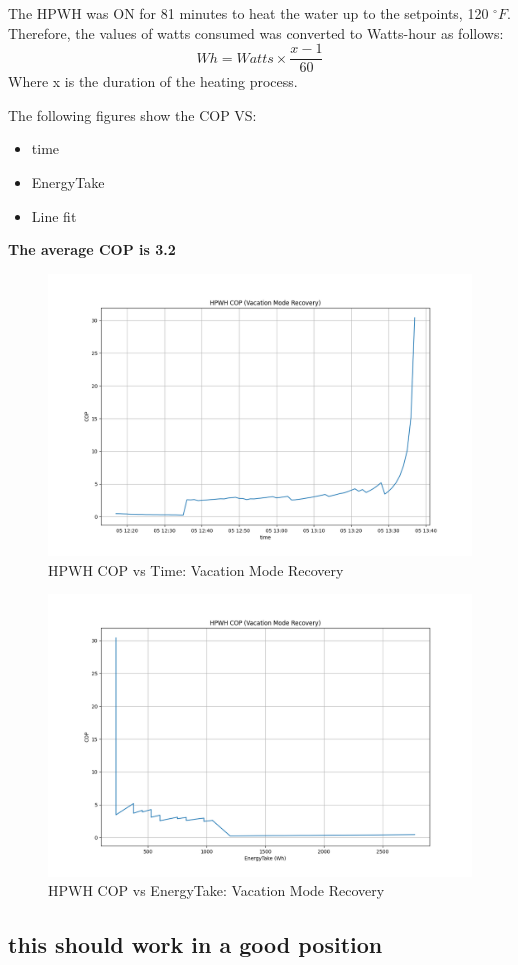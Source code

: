 The HPWH was ON for 81 minutes to heat the water up to the setpoints, 120 $^{\circ}F$. Therefore, the values of watts consumed was converted to Watts-hour as follows:
\begin{equation}
    Wh = Watts \times \frac{x-1}{60}
\end{equation}
Where x is the duration of the heating process.

The following figures show the COP VS:
\begin{itemize}
    \item time
    \item EnergyTake
    \item Line fit
\end{itemize}
\textbf{The average COP is 3.2}

\begin{figure}[htp!]
    \centering
    \includegraphics[width=1.1\columnwidth]{Pictures/cop_vs_time.png}
    \caption{HPWH COP vs Time: Vacation Mode Recovery}
    \label{fig:copvstime}
\end{figure}

\begin{figure}[htp!]
    \centering
    \includegraphics[width=1.1\columnwidth]{Pictures/cop_vs_EnergyTake.png}
    \caption{HPWH COP vs EnergyTake: Vacation Mode Recovery}
    \label{fig:copvsenergytake}
\end{figure}
\newpage

\subsection{this should work in a good position}
